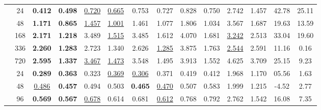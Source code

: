\begin{table*}[t]
{\begin{tabular}{c|c|cc|cc|cc|cc|cc|SS|}
    \midrule[0.5pt]
    & 24  &\textbf{0.412} & \textbf{0.498} & \underline{0.720}          & \underline{0.665}          & 0.753                   & 0.727                   & 0.828                   & 0.750                   & 2.742                   & 1.457        &42.78 &  25.11         \\
    & 48  &\textbf{1.171} & \textbf{0.865} & \underline{1.457}          & \underline{1.001}          & {1.461}                   & 1.077                   & 1.806                   & 1.034                   & 3.567                   & 1.687        &19.63 &  13.59        \\
    & 168 &\textbf{2.171} & \textbf{1.218} & 3.489                   & \underline{1.515}          & 3.485                   & 1.612                   & 4.070                   & 1.681                   & \underline{3.242}          & 2.513        &33.04 &  19.60        \\
    & 336 &\textbf{2.260} & \textbf{1.283} & 2.723                   & 1.340                   & 2.626                   & \underline{1.285}          & 3.875                   & 1.763                   & \underline{2.544}          & 2.591        &11.16 &  0.16        \\
    & 720 &\textbf{2.595} & \textbf{1.337} & \underline{3.467}          & \underline{1.473}          & 3.548                   & 1.495                   & 3.913                   & 1.552                   & 4.625                   & 3.709        &25.15 &  9.23       \\
    \midrule[0.5pt]
    & 24 &\textbf{0.289} &\textbf{0.363}  & 0.323                   & \underline{0.369}          & \underline{0.306}          & 0.371                   & 0.419                   & 0.412                   & 1.968                   & 1.170         &05.56  &  1.63        \\
    & 48 &\underline{0.486} &\textbf{0.457}  & 0.494                   & 0.503                   & \textbf{0.465}          & \underline{0.470}          & 0.507                   & 0.583                   & 1.999                   & 1.215         &-4.52 &   2.77       \\
    & 96  &\textbf{0.569} &\textbf{0.567} & \underline{0.678}          & 0.614                   & 0.681                   & \underline{0.612}          & 0.768                   & 0.792                   & 2.762                   & 1.542         &16.08 &   7.35       \\

\end{tabular}}
\end{table*}

